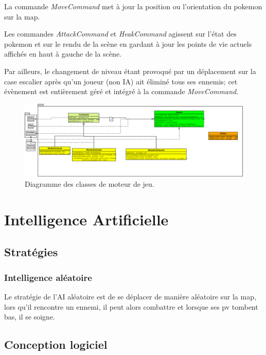 \documentclass[a4paper,12pt]{article}
\begin{document}
La commande \emph{MoveCommand} met à jour la position ou l'orientation du pokemon sur la map.

Les commandes \emph{AttackCommand} et \emph{HeakCommand} agissent sur l'état des pokemon et sur le rendu de la scène en gardant à jour les points de vie actuels affichés en haut à gauche de la scène.

Par ailleurs, le changement de niveau étant provoqué par un déplacement sur la case escalier après qu'un joueur (non IA) ait éliminé tous ses ennemis; cet évènement est entièrement géré et intégré à la commande \emph{MoveCommand}.

    \begin{landscape}
    \begin{figure}[p]
    \includegraphics[width=0.9\paperheight]{engine.png}
    \caption{\label{uml:engine}Diagramme des classes de moteur de jeu.}
    \end{figure}
    \end{landscape}


    \section{Intelligence Artificielle}

    \subsection{Stratégies}
    \subsubsection{Intelligence aléatoire}
    
    Le stratégie de l'AI aléatoire est de se déplacer de manière aléatoire sur la map, lors qu'il rencontre un ennemi, il peut alors combattre et lorsque ses pv tombent bas, il se soigne.
    
    \clearpage
    \subsection{Conception logiciel}
    
\end{document}
